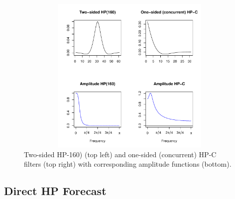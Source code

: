 \documentclass[a4paper]{article}
\begin{document}
\begin{figure}[H]\begin{center}\includegraphics[height=3in, width=4.5in]{./Figures/hp_160.pdf}\caption{Two-sided HP-160) (top left) and one-sided (concurrent) HP-C filters (top right) with corresponding amplitude functions (bottom).\label{hp_160}}\end{center}\end{figure}
\subsection{Direct HP Forecast}\label{hpdf}
\end{document}
